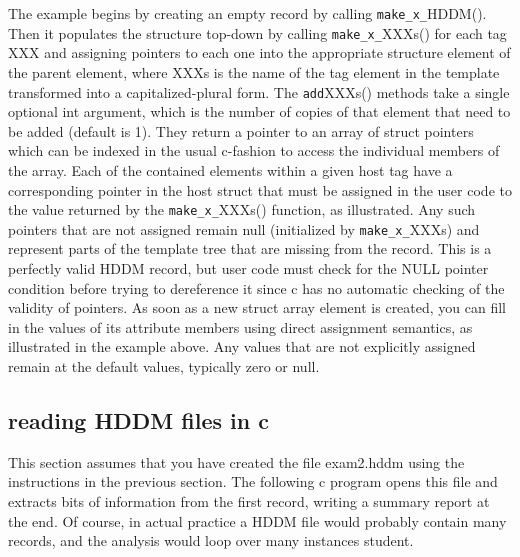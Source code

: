 \documentclass{revtex4}
\begin{document}
The example begins by creating an empty record by calling \texttt{make\_x\_}HDDM().
Then it populates the structure top-{}down by calling \texttt{make\_x\_}XXXs()
for each tag XXX and assigning pointers to each one into the appropriate 
structure element of the parent element, where XXXs is the name of the tag
element in the template transformed into a capitalized-{}plural form.
The \texttt{add}XXXs() methods take a single optional int argument, which is
the number of copies of that element that need to be added (default is 1). 
They return a pointer to an array of struct pointers which can be indexed in
the usual c-{}fashion to access the individual members of the array. Each of
the contained elements within a given host tag have a corresponding pointer
in the host struct that must be assigned in the user code to the value returned
by the \texttt{make\_x\_}XXXs() function, as illustrated. Any such pointers
that are not assigned remain null (initialized by \texttt{make\_x\_}XXXs) and
represent parts of the template tree that are missing from the record. This
is a perfectly valid HDDM record, but user code must check for the NULL
pointer condition before trying to dereference it since c has no automatic
checking of the validity of pointers. As soon as a new struct array element is
created, you can fill in the values of its attribute members using direct
assignment semantics, as illustrated in the example above. Any values that
are not explicitly assigned remain at the default values, typically zero or null.

\subsection{reading HDDM files in c}

This section assumes that you have created the file exam2.hddm using the 
instructions in the previous section. The following c program opens this file
and extracts bits of information from the first record, writing a summary
report at the end. Of course, in actual practice a HDDM file would probably
contain many records, and the analysis would loop over many instances student.
\end{document}

